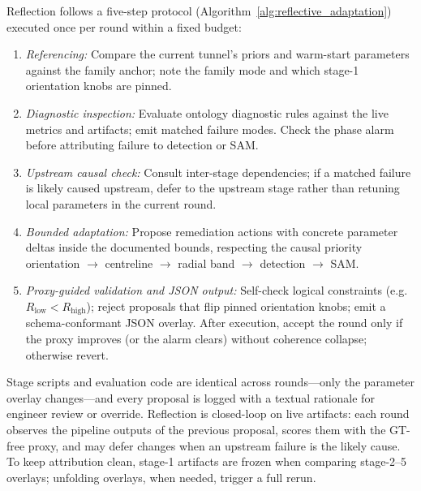 \documentclass[a4paper,fleqn]{cas-dc}
\begin{document}
Reflection follows a five-step protocol (Algorithm~\ref{alg:reflective_adaptation}) executed once per round within a fixed budget:
\begin{enumerate}
    \item \emph{Referencing:} Compare the current tunnel's priors and warm-start parameters against the family anchor; note the family mode and which stage-1 orientation knobs are pinned.
    \item \emph{Diagnostic inspection:} Evaluate ontology diagnostic rules against the live metrics and artifacts; emit matched failure modes. Check the phase alarm before attributing failure to detection or SAM.
    \item \emph{Upstream causal check:} Consult inter-stage dependencies; if a matched failure is likely caused upstream, defer to the upstream stage rather than retuning local parameters in the current round.
    \item \emph{Bounded adaptation:} Propose remediation actions with concrete parameter deltas inside the documented bounds, respecting the causal priority orientation $\rightarrow$ centreline $\rightarrow$ radial band $\rightarrow$ detection $\rightarrow$ SAM.
    \item \emph{Proxy-guided validation and JSON output:} Self-check logical constraints (e.g.\ $R_\mathrm{low}<R_\mathrm{high}$); reject proposals that flip pinned orientation knobs; emit a schema-conformant JSON overlay. After execution, accept the round only if the proxy improves (or the alarm clears) without coherence collapse; otherwise revert.
\end{enumerate}

Stage scripts and evaluation code are identical across rounds---only the parameter overlay changes---and every proposal is logged with a textual rationale for engineer review or override. Reflection is closed-loop on live artifacts: each round observes the pipeline outputs of the previous proposal, scores them with the GT-free proxy, and may defer changes when an upstream failure is the likely cause. To keep attribution clean, stage-1 artifacts are frozen when comparing stage-2--5 overlays; unfolding overlays, when needed, trigger a full rerun.
\end{document}
